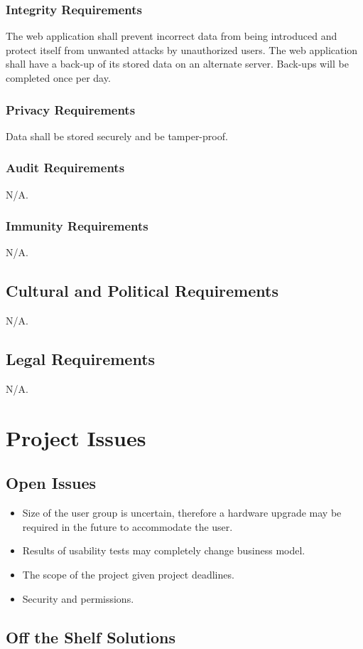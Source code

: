 \documentclass[12pt]{article}
\begin{document}
{{{{{{{\subsubsection{Integrity Requirements}
The web application shall prevent incorrect data from being introduced and 
protect itself from unwanted attacks by unauthorized users. The web application 
shall have a back-up of its stored data on an alternate server. Back-ups will be completed once per day.
\subsubsection{Privacy Requirements}
Data shall be stored securely and be tamper-proof.
\subsubsection{Audit Requirements}
N/A.
\subsubsection{Immunity Requirements}
N/A.
\subsection{Cultural and Political Requirements}
N/A.
\subsection{Legal Requirements}
N/A.

\section{Project Issues}
\subsection{Open Issues}
\begin{itemize}
  \item Size of the user group is uncertain, therefore a hardware upgrade may be 
required in the future to accommodate the user.
  \item Results of usability tests may completely change business model.
  \item The scope of the project given project deadlines.
  \item Security and permissions.
\end{itemize}

\subsection{Off the Shelf Solutions}
}}}}}}}
\end{document}
